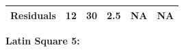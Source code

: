 \documentclass[]{article}
\begin{document}
\begin{longtable}[]{@{}cccccc@{}}
\begin{minipage}[t]{0.19\columnwidth}
\textbf{Residuals}\strut
\end{minipage} & \begin{minipage}[t]{0.06\columnwidth}\centering\strut
12\strut
\end{minipage} & \begin{minipage}[t]{0.10\columnwidth}\centering\strut
30\strut
\end{minipage} & \begin{minipage}[t]{0.12\columnwidth}\centering\strut
2.5\strut
\end{minipage} & \begin{minipage}[t]{0.12\columnwidth}\centering\strut
NA\strut
\end{minipage} & \begin{minipage}[t]{0.12\columnwidth}\centering\strut
NA\strut
\end{minipage}\tabularnewline
\bottomrule
\end{longtable}

\textbf{Latin Square 5:}
\end{document}

